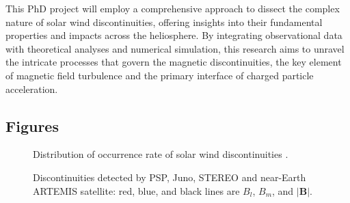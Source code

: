 \documentclass[
  letterpaper,
  DIV=11,
  numbers=noendperiod]{scrartcl}
\begin{document}
This PhD project will employ a comprehensive approach to dissect the complex nature of solar wind discontinuities, offering insights into their fundamental properties and impacts across the heliosphere. By integrating observational data with theoretical analyses and numerical simulation, this research aims to unravel the intricate processes that govern the magnetic discontinuities, the key element of magnetic field turbulence and the primary interface of charged particle acceleration.

\subsection{Figures}\label{figures}

\begin{figure}


\caption{\label{fig-1}Distribution of occurrence rate of solar wind discontinuities \citep{sodingRadialLatitudinalDependencies2001}.}

\end{figure}%

\begin{figure}


\caption{\label{fig-examples}Discontinuities detected by PSP, Juno, STEREO and near-Earth ARTEMIS satellite: red, blue, and black lines are \(B_l\), \(B_m\), and \(|{\mathbf B}|\).}

\end{figure}%
\end{document}
